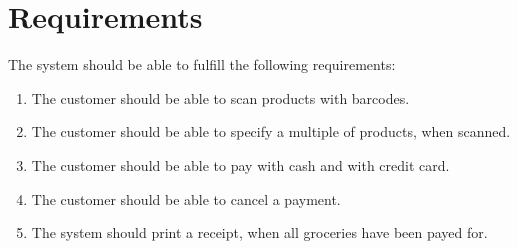 \chapter{Requirements}
The system should be able to fulfill the following requirements:

\begin{enumerate}[label=R.\arabic*:]
\item The customer should be able to scan products with barcodes.
\item The customer should be able to specify a multiple of products, when scanned.
\item The customer should be able to pay with cash and with credit card.
\item The customer should be able to cancel a payment.
\item The system should print a receipt, when all groceries have been payed for.
\end{enumerate}
